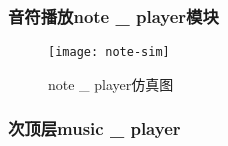 \documentclass{../source/Experiment}
\begin{document}
            \subsubsection{音符播放note \_ player模块}
                \begin{figure}[H]
                    \centering
                    \texttt{[image: note-sim]}
                    \caption{note \_ player仿真图}
                \end{figure}
            \subsubsection{次顶层music \_ player}
\end{document}
